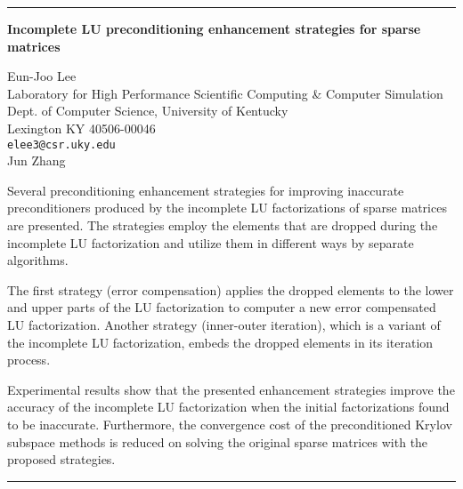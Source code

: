 \documentclass[twosided]{report}
\begin{document}
	\begin{center} \rule{6in}{1pt} \end{center}

\begin{center}
{\large			%
{\bf Incomplete LU preconditioning enhancement strategies for sparse matrices}}

	Eun-Joo Lee \\
	Laboratory for High Performance Scientific Computing
		\& Computer Simulation \\
	Dept. of Computer Science, University of Kentucky \\
	Lexington KY 40506-00046 \\
	{\tt elee3@csr.uky.edu}
	\\ Jun Zhang
\end{center}
Several preconditioning enhancement strategies for improving
inaccurate preconditioners produced by the incomplete LU
factorizations of sparse matrices are presented.  The strategies
employ the elements that are dropped during the incomplete LU
factorization and utilize them in different ways by separate
algorithms.

 The first strategy (error compensation) applies the
dropped elements to the lower and upper parts of the LU
factorization to computer a new error compensated LU factorization.
Another strategy (inner-outer iteration), which is a variant of the
incomplete LU factorization, embeds the dropped elements in its
iteration process.

Experimental results show that the presented
enhancement strategies improve the accuracy of the incomplete LU
factorization when the initial factorizations found to be
inaccurate.  Furthermore, the convergence cost of the preconditioned
Krylov subspace methods is reduced on solving the original sparse
matrices with the proposed strategies.


	\begin{center} \rule{6in}{1pt} \end{center}

\newpage
\end{document}

